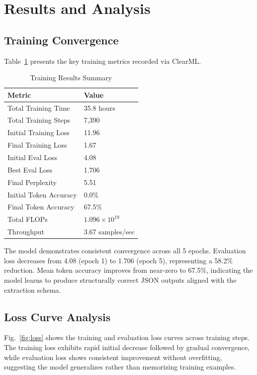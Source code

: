\documentclass[conference]{IEEEtran}
\begin{document}
\section{Results and Analysis}

\subsection{Training Convergence}

Table~\ref{tab:training_results} presents the key training metrics recorded via ClearML.

\begin{table}[t]
\caption{Training Results Summary}
\label{tab:training_results}
\centering
\begin{tabular}{ll}
\hline
\textbf{Metric} & \textbf{Value} \\
\hline
Total Training Time & 35.8 hours \\
Total Training Steps & 7,390 \\
Initial Training Loss & 11.96 \\
Final Training Loss & 1.67 \\
Initial Eval Loss & 4.08 \\
Best Eval Loss & 1.706 \\
Final Perplexity & 5.51 \\
Initial Token Accuracy & 0.0\% \\
Final Token Accuracy & 67.5\% \\
Total FLOPs & $1.096 \times 10^{19}$ \\
Throughput & 3.67 samples/sec \\
\hline
\end{tabular}
\end{table}

The model demonstrates consistent convergence across all 5 epochs. Evaluation loss decreases from 4.08 (epoch 1) to 1.706 (epoch 5), representing a 58.2\% reduction. Mean token accuracy improves from near-zero to 67.5\%, indicating the model learns to produce structurally correct JSON outputs aligned with the extraction schema.

\subsection{Loss Curve Analysis}

Fig.~\ref{fig:loss} shows the training and evaluation loss curves across training steps. The training loss exhibits rapid initial decrease followed by gradual convergence, while evaluation loss shows consistent improvement without overfitting, suggesting the model generalizes rather than memorizing training examples.
\end{document}
